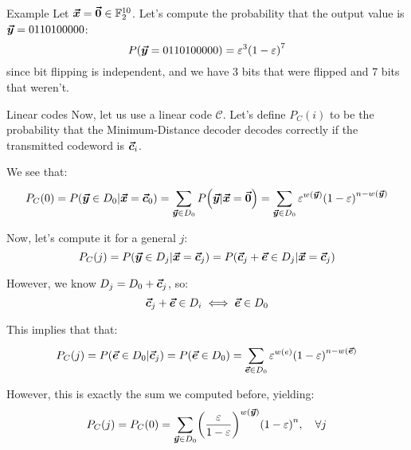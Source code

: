 \documentclass[a4paper]{article}
\begin{document}
\begin{parag}{Example}
    Let $\bm{\protect\vec{x}} = \bm{\protect\vec{0}} \in\mathbb{F}_2^{10}$. Let's compute the probability that the output value is $\bm{\protect\vec{y}} = 0110100000$: 
    \[P\left(\bvec{y} = 0110100000\right) = \epsilon^3 \left(1 - \epsilon\right)^7\]
    since bit flipping is independent, and we have 3 bits that were flipped and 7 bits that weren't.
\end{parag}

\begin{parag}{Linear codes}
    Now, let us use a linear code $\mathcal{C}$. Let's define $P_C\left(i\right)$ to be the probability that the Minimum-Distance decoder decodes correctly if the transmitted codeword is $\bm{\protect\vec{c}}_i$.

    We see that: 
    \[P_C\left(0\right) = P\left(\bvec{y} \in D_0 | \bvec{x} = \bvec{c}_0\right) = \sum_{\bvec{y} \in D_0}^{} P\left(\bvec{y} | \bvec{x} = \bvec{0}\right)= \sum_{\bvec{y} \in D_0}^{} \epsilon^{w\left(\bvec{y}\right)} \left(1- \epsilon\right)^{n - w\left(\bvec{y}\right)}\]

    Now, let's compute it for a general $j$: 
    \[P_C\left(j\right) = P\left(\bvec{y} \in D_j | \bvec{x} = \bvec{c}_j\right) = P\left(\bvec{c}_j + \bvec{e} \in D_j | \bvec{x} = \bvec{c}_j\right)\]

    However, we know $D_j = D_0 + \bm{\protect\vec{c}}_j$, so: 
    \[\bm{\protect\vec{c}}_j + \bm{\protect\vec{e}} \in D_i \iff \bm{\protect\vec{e}} \in D_0\]
    
    This implies that that: 
    \[P_C\left(j\right) = P\left(\bvec{e} \in D_0 | \bvec{c}_j\right) = P\left(\bvec{e} \in D_0\right) = \sum_{\bvec{e} \in D_0}^{} \epsilon^{w\left(e\right)} \left(1 - \epsilon\right)^{n - w\left(\bvec{e}\right)}\]
    
    However, this is exactly the sum we computed before, yielding: 
    \[P_C\left(j\right) = P_C\left(0\right) = \sum_{\bvec{y} \in D_0}^{} \left(\frac{\epsilon}{1 - \epsilon}\right)^{w\left(\bvec{y}\right)} \left(1 - \epsilon\right)^n, \mathspace \forall j\]
\end{parag}
\end{document}
